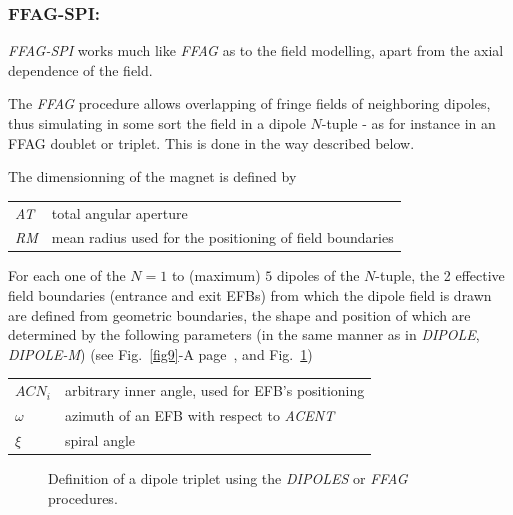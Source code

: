 \newpage


\subsubsection*{FFAG-SPI: \FFAGSPITitl} \label{FFAG-SPI} 
\medskip

\noindent \textsl{FFAG-SPI} works much like \textsl{FFAG} 
as to the field modelling, apart from the axial  dependence of the field. 

\bigskip

\noindent The \textsl{FFAG} procedure allows overlapping of fringe fields of neighboring dipoles, 
thus simulating in some sort the field in a dipole $N$-tuple - as for instance in an FFAG doublet 
or triplet. This is done in the way described below. 

\bigskip

\noindent  The dimensionning of the magnet is defined by

\bigskip

 \begin{tabular}{>{\sl}l!{:}l}
	 AT &  total angular aperture \\
	 RM & mean radius used for the positioning of field boundaries\\
 \end{tabular}

\bigskip

\noindent For each one of the $N=1$ to (maximum) $5$ dipoles of the  $N$-tuple, 
the 2  effective field boundaries (entrance and exit EFBs) from which  the dipole field  is drawn are
defined from geometric boundaries, the shape and position of which are determined by the 
following parameters (in the same manner as in \textsl{DIPOLE}, \textsl{DIPOLE-M})
 (see Fig.~\ref{fig9}-A page~\pageref{fig9}, and Fig.~\ref{figFFAGSPI}) 

\bigskip

\begin{tabular}{l!{:}l}
	$ACN_i$  & arbitrary inner angle, used for EFB's positioning  \\
	$\omega$ &  azimuth of an EFB with respect to  \textsl{ACENT}\\
	$\xi$ & spiral angle \\
\end{tabular}

\begin{figure}[h]
 \begin{center}
 \caption{ \label{figFFAGSPI}
Definition of a dipole triplet using  the \textsl{DIPOLES} or  \textsl{FFAG}  procedures. 
}
  \end{center}
\end{figure}


